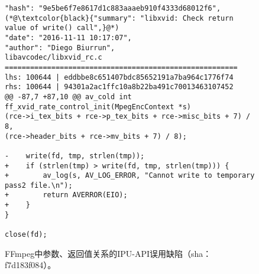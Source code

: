 \begin{figure}[b]
	\centering
\begin{lstlisting}
"hash": "9e5be6f7e8617d1c883aaaeb910f4333d68012f6",
(*@\textcolor{black}{"summary": "libxvid: Check return value of write() call",}@*)
"date": "2016-11-11 10:17:07",
"author": "Diego Biurrun",
libavcodec/libxvid_rc.c
=======================================================
lhs: 100644 | eddbbe8c651407bdc85652191a7ba964c1776f74
rhs: 100644 | 94301a2ac1ffc10a8b22ba491c70013463107452
@@ -87,7 +87,10 @@ av_cold int ff_xvid_rate_control_init(MpegEncContext *s)
(rce->i_tex_bits + rce->p_tex_bits + rce->misc_bits + 7) / 8,
(rce->header_bits + rce->mv_bits + 7) / 8);

-    write(fd, tmp, strlen(tmp));
+    if (strlen(tmp) > write(fd, tmp, strlen(tmp))) {
+        av_log(s, AV_LOG_ERROR, "Cannot write to temporary pass2 file.\n");
+        return AVERROR(EIO);
+    }
}

close(fd);

\end{lstlisting}
	\caption{
	FFmpeg中参数、返回值关系的IPU-API误用缺陷（sha：f7d183f084）。
	}
	\label{fig:2-3-ipu-2}
\end{figure}